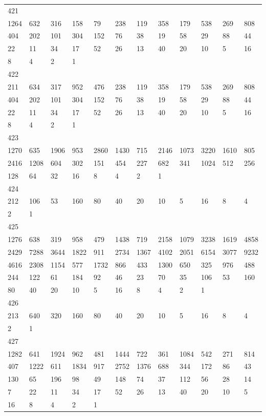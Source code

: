\begin{longtable}{llllllllllll}
421&&&&&&&&&&&\\
1264& 632& 316& 158& 79& 238& 119& 358& 179& 538& 269& 808\\
404& 202& 101& 304& 152& 76& 38& 19& 58& 29& 88& 44\\
22& 11& 34& 17& 52& 26& 13& 40& 20& 10& 5& 16\\
8& 4& 2& 1& \\

422&&&&&&&&&&&\\
211& 634& 317& 952& 476& 238& 119& 358& 179& 538& 269& 808\\
404& 202& 101& 304& 152& 76& 38& 19& 58& 29& 88& 44\\
22& 11& 34& 17& 52& 26& 13& 40& 20& 10& 5& 16\\
8& 4& 2& 1& \\

423&&&&&&&&&&&\\
1270& 635& 1906& 953& 2860& 1430& 715& 2146& 1073& 3220& 1610& 805\\
2416& 1208& 604& 302& 151& 454& 227& 682& 341& 1024& 512& 256\\
128& 64& 32& 16& 8& 4& 2& 1& \\

424&&&&&&&&&&&\\
212& 106& 53& 160& 80& 40& 20& 10& 5& 16& 8& 4\\
2& 1& \\

425&&&&&&&&&&&\\
1276& 638& 319& 958& 479& 1438& 719& 2158& 1079& 3238& 1619& 4858\\
2429& 7288& 3644& 1822& 911& 2734& 1367& 4102& 2051& 6154& 3077& 9232\\
4616& 2308& 1154& 577& 1732& 866& 433& 1300& 650& 325& 976& 488\\
244& 122& 61& 184& 92& 46& 23& 70& 35& 106& 53& 160\\
80& 40& 20& 10& 5& 16& 8& 4& 2& 1& \\

426&&&&&&&&&&&\\
213& 640& 320& 160& 80& 40& 20& 10& 5& 16& 8& 4\\
2& 1& \\

427&&&&&&&&&&&\\
1282& 641& 1924& 962& 481& 1444& 722& 361& 1084& 542& 271& 814\\
407& 1222& 611& 1834& 917& 2752& 1376& 688& 344& 172& 86& 43\\
130& 65& 196& 98& 49& 148& 74& 37& 112& 56& 28& 14\\
7& 22& 11& 34& 17& 52& 26& 13& 40& 20& 10& 5\\
16& 8& 4& 2& 1& \\


\end{longtable}
